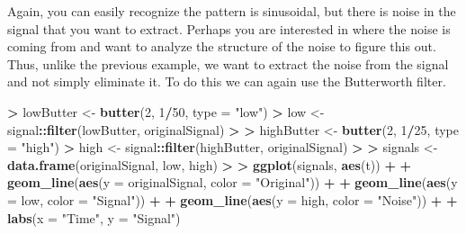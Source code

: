 \documentclass[]{krantz}
\makeatletter
\newenvironment{Shaded}{\begin{snugshade}}{\end{snugshade}}
\newcommand{\DataTypeTok}[1]{\textcolor[rgb]{0.27,0.27,0.27}{#1}}
\newcommand{\DecValTok}[1]{\textcolor[rgb]{0.06,0.06,0.06}{#1}}
\newcommand{\ErrorTok}[1]{\textcolor[rgb]{0.14,0.14,0.14}{\textbf{#1}}}
\newcommand{\KeywordTok}[1]{\textcolor[rgb]{0.27,0.27,0.27}{\textbf{#1}}}
\newcommand{\NormalTok}[1]{#1}
\newcommand{\OperatorTok}[1]{\textcolor[rgb]{0.43,0.43,0.43}{\textbf{#1}}}
\newcommand{\StringTok}[1]{\textcolor[rgb]{0.5,0.5,0.5}{#1}}
\newenvironment{kframe}{%
\medskip{}
\setlength{\fboxsep}{.8em}
 \def\at@end@of@kframe{}%
 \ifinner\ifhmode%
  \def\at@end@of@kframe{\end{minipage}}%
  \begin{minipage}{\columnwidth}%
 \fi\fi%
 \def\FrameCommand##1{\hskip\@totalleftmargin \hskip-\fboxsep
 \colorbox{shadecolor}{##1}\hskip-\fboxsep
     \hskip-\linewidth \hskip-\@totalleftmargin \hskip\columnwidth}%
 \MakeFramed {\advance\hsize-\width
   \@totalleftmargin\z@ \linewidth\hsize
   \@setminipage}}%
 {\par\unskip\endMakeFramed%
 \at@end@of@kframe}
\renewenvironment{Shaded}{\begin{kframe}}{\end{kframe}}
\makeatother
\begin{document}
Again, you can easily recognize the pattern is sinusoidal, but there is noise in the signal that you want to extract. Perhaps you are interested in where the noise is coming from and want to analyze the structure of the noise to figure this out. Thus, unlike the previous example, we want to extract the noise from the signal and not simply eliminate it. To do this we can again use the Butterworth filter.

\begin{Shaded}
\begin{Highlighting}[]
\OperatorTok{>}\StringTok{ }\NormalTok{lowButter <-}\StringTok{ }\KeywordTok{butter}\NormalTok{(}\DecValTok{2}\NormalTok{, }\DecValTok{1}\OperatorTok{/}\DecValTok{50}\NormalTok{, }\DataTypeTok{type =} \StringTok{"low"}\NormalTok{)}
\OperatorTok{>}\StringTok{ }\NormalTok{low <-}\StringTok{ }\NormalTok{signal}\OperatorTok{::}\KeywordTok{filter}\NormalTok{(lowButter, originalSignal)}
\OperatorTok{>}\StringTok{ }
\ErrorTok{>}\StringTok{ }\NormalTok{highButter <-}\StringTok{ }\KeywordTok{butter}\NormalTok{(}\DecValTok{2}\NormalTok{, }\DecValTok{1}\OperatorTok{/}\DecValTok{25}\NormalTok{, }\DataTypeTok{type =} \StringTok{"high"}\NormalTok{)}
\OperatorTok{>}\StringTok{ }\NormalTok{high <-}\StringTok{ }\NormalTok{signal}\OperatorTok{::}\KeywordTok{filter}\NormalTok{(highButter, originalSignal)}
\OperatorTok{>}\StringTok{ }
\ErrorTok{>}\StringTok{ }\NormalTok{signals <-}\StringTok{ }\KeywordTok{data.frame}\NormalTok{(originalSignal, low, high)}
\OperatorTok{>}\StringTok{ }
\ErrorTok{>}\StringTok{ }\KeywordTok{ggplot}\NormalTok{(signals, }\KeywordTok{aes}\NormalTok{(t)) }\OperatorTok{+}\StringTok{ }
\OperatorTok{+}\StringTok{   }\KeywordTok{geom_line}\NormalTok{(}\KeywordTok{aes}\NormalTok{(}\DataTypeTok{y =}\NormalTok{ originalSignal, }\DataTypeTok{color =} \StringTok{"Original"}\NormalTok{)) }\OperatorTok{+}\StringTok{ }
\OperatorTok{+}\StringTok{   }\KeywordTok{geom_line}\NormalTok{(}\KeywordTok{aes}\NormalTok{(}\DataTypeTok{y =}\NormalTok{ low, }\DataTypeTok{color =} \StringTok{"Signal"}\NormalTok{)) }\OperatorTok{+}\StringTok{ }
\OperatorTok{+}\StringTok{   }\KeywordTok{geom_line}\NormalTok{(}\KeywordTok{aes}\NormalTok{(}\DataTypeTok{y =}\NormalTok{ high, }\DataTypeTok{color =} \StringTok{"Noise"}\NormalTok{)) }\OperatorTok{+}\StringTok{ }
\OperatorTok{+}\StringTok{   }\KeywordTok{labs}\NormalTok{(}\DataTypeTok{x =} \StringTok{"Time"}\NormalTok{, }\DataTypeTok{y =} \StringTok{"Signal"}\NormalTok{)}
\end{Highlighting}
\end{Shaded}
\end{document}
